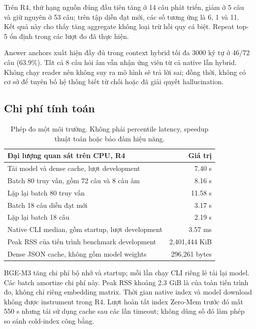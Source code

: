 \documentclass[11pt,a4paper]{article}
\begin{document}
Trên R4, thứ hạng nguồn đúng đầu tiên tăng ở 14 câu phát triển, giảm ở 5 câu và giữ nguyên ở 53 câu; trên tập diễn đạt mới, các số tương ứng là 6, 1 và 11. Kết quả này cho thấy tăng aggregate không loại trừ hồi quy cá biệt. Repeat top-5 ổn định trong các lượt đo đã thực hiện.

Answer anchors xuất hiện đầy đủ trong context hybrid tối đa 3000 ký tự ở 46/72 câu (63.9\%). Tất cả 8 câu hỏi âm vẫn nhận ứng viên từ cả native lẫn hybrid. Không chạy reader nên không suy ra mô hình sẽ trả lời sai; đồng thời, không có cơ sở để tuyên bố hệ thống biết từ chối hoặc đã giải quyết hallucination.

\subsection{Chi phí tính toán}
\begin{table}[ht]
\centering
\begin{tabularx}{\linewidth}{@{}Xr@{}}
\toprule
Đại lượng quan sát trên CPU, R4 & Giá trị \\
\midrule
Tải model và dense cache, lượt development & 7.40 s \\
Batch 80 truy vấn, gồm 72 câu và 8 câu âm & 8.16 s \\
Lặp lại batch 80 truy vấn & 11.58 s \\
Batch 18 câu diễn đạt mới & 3.17 s \\
Lặp lại batch 18 câu & 2.19 s \\
Native CLI median, gồm startup, lượt development & 3.57 ms \\
Peak RSS của tiến trình benchmark development & 2,401,444 KiB \\
Dense JSON cache, không gồm model weights & 296,261 bytes \\
\bottomrule
\end{tabularx}
\caption{Phép đo một môi trường. Không phải percentile latency, speedup thuật toán hoặc bảo đảm hiệu năng.}
\end{table}

BGE-M3 tăng chi phí bộ nhớ và startup; mỗi lần chạy CLI riêng lẻ tải lại model. Các batch amortize chi phí này. Peak RSS khoảng 2.3 GiB là của toàn tiến trình đo, không chỉ riêng embedding matrix. Thời gian native index và model download không được instrument trong R4. Lượt hoàn tất index Zero-Mem trước đó mất 550 s nhưng tái sử dụng cache sau các lần timeout; không dùng số đó làm phép so sánh cold-index công bằng.
\end{document}
